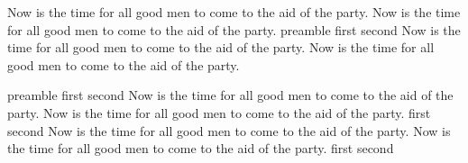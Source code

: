 \documentclass{article}
\begin{document}
\normalbaselines
{}
\def\rightcomment#1{{%
   \advance\hsize by -\leftskip
   \rlap{\hbox to\hsize{\hfil #1}}%
}}
\def\leftcomment#1{\llap{\hbox to\leftskip{#1\hfil}}}

Now is the time for all good men to come to the aid of the party.
Now is the time for all good men to come to the aid of the party.
\pex preamble
\a first
\a second
\xe
Now is the time for all good men to come to the aid of the party.
Now is the time for all good men to come to the aid of the party.

\pex preamble
\a first
\a second
\xe
Now is the time for all good men to come to the aid of the party.
Now is the time for all good men to come to the aid of the party.
\pex
\a first
\a second
\xe
Now is the time for all good men to come to the aid of the party.
Now is the time for all good men to come to the aid of the party.
\pex
\a first
\a second
\xe
\end{document}
